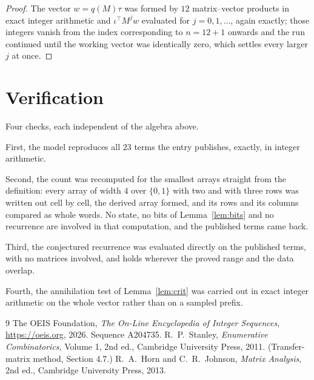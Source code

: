 \documentclass[11pt,a4paper]{article}
\theoremstyle{plain}
\theoremstyle{definition}
\begin{document}
\begin{proof}
The vector $w=q(M)\tau$ was formed by $12$ matrix--vector products in exact integer
arithmetic and $\iota^{\!\top}M^{j}w$ evaluated for $j=0,1,\dots$, again exactly; those
integers vanish from the index corresponding to $n=12+1$ onwards and the run continued
until the working vector was identically zero, which settles every larger $j$ at once.
\end{proof}

\section{Verification}

Four checks, each independent of the algebra above.

First, the model reproduces all $23$ terms the entry publishes, exactly, in integer
arithmetic.

Second, the count was recomputed for the smallest arrays straight from the definition: every
array of width $4$ over $\{0,1\}$ with two and with three rows was written out cell by cell,
the derived array formed, and its rows and its columns compared as whole words. No state, no
bits of Lemma~\ref{lem:bits} and no recurrence are involved in that computation, and the
published terms came back.

Third, the conjectured recurrence was evaluated directly on the published terms, with no
matrices involved, and holds wherever the proved range and the data overlap.

Fourth, the annihilation test of Lemma~\ref{lem:crit} was carried out in exact integer
arithmetic on the whole vector rather than on a sampled prefix.

\begin{thebibliography}{9}
 The OEIS Foundation, \emph{The On-Line Encyclopedia of Integer
Sequences}, \url{https://oeis.org}, 2026. Sequence A204735.
 R.~P.~Stanley, \emph{Enumerative Combinatorics}, Volume 1, 2nd ed.,
Cambridge University Press, 2011. (Transfer-matrix method, Section 4.7.)
 R.~A.~Horn and C.~R.~Johnson, \emph{Matrix Analysis}, 2nd ed., Cambridge
University Press, 2013.
\end{thebibliography}
\end{document}
